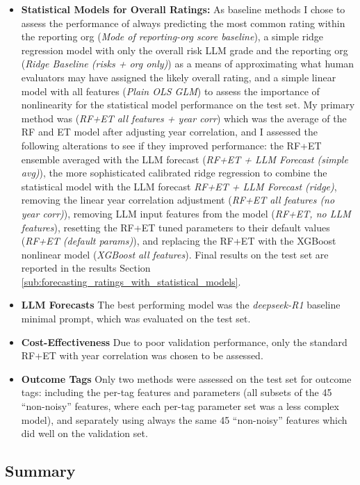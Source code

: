 \documentclass[12pt,a4paper]{article}
\begin{document}
\begin{itemize}
  \item \textbf{ Statistical Models for Overall Ratings:} As baseline methods I chose to assess the performance of always predicting the most common rating within the reporting org (\emph{Mode of reporting-org score baseline}), a simple ridge regression model with only the overall risk LLM grade and the reporting org (\emph{Ridge Baseline (risks + org only)}) as a means of approximating what human evaluators may have assigned the likely overall rating, and a simple linear model with all features (\emph{Plain OLS GLM}) to assess the importance of nonlinearity for the statistical model performance on the test set. My primary method was (\emph{RF+ET all features + year corr}) which was the average of the RF and ET model after adjusting year correlation, and I assessed the following alterations to see if they improved performance: the RF+ET ensemble averaged with the LLM forecast (\emph{RF+ET + LLM Forecast (simple avg)}), the more sophisticated calibrated ridge regression to combine the statistical model with the LLM forecast \emph{RF+ET + LLM Forecast (ridge)}, removing the linear year correlation adjustment (\emph{RF+ET all features (no year corr)}), removing LLM input features from the model (\emph{RF+ET, no LLM features}), resetting the RF+ET tuned parameters to their default values (\emph{RF+ET (default params)}), and replacing the RF+ET with the XGBoost nonlinear model (\emph{XGBoost all features}). Final results on the test set are reported in the results Section \ref{sub:forecasting_ratings_with_statistical_models}.
  \item \textbf{LLM Forecasts} The best performing model was the \emph{deepseek-R1} baseline minimal prompt, which was evaluated on the test set.
  \item \textbf{Cost-Effectiveness} Due to poor validation performance, only the standard RF+ET with year correlation was chosen to be assessed.
  \item \textbf{Outcome Tags} Only two methods were assessed on the test set for outcome tags: including the per-tag features and parameters (all subsets of the 45 ``non-noisy'' features, where each per-tag parameter set was a less complex model), and separately using always the same 45 ``non-noisy'' features which did well on the validation set.

\end{itemize}


\subsection{Summary} \label{sub:methodssummary}
\end{document}
